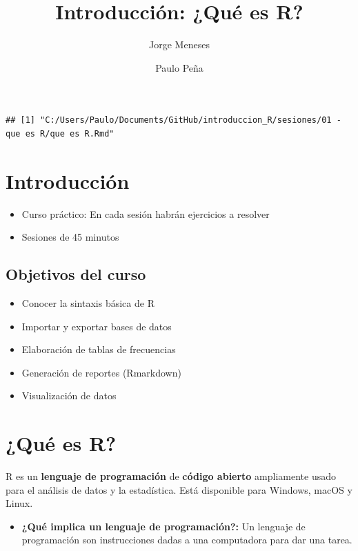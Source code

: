 \documentclass[]{tufte-handout}
\title{Introducción: ¿Qué es R?}
\author{Jorge Meneses \and Paulo Peña}
\date{}
\providecommand{\tightlist}{%
  \setlength{\itemsep}{0pt}\setlength{\parskip}{0pt}}
\begin{document}
\maketitle




\begin{verbatim}
## [1] "C:/Users/Paulo/Documents/GitHub/introduccion_R/sesiones/01 - que es R/que es R.Rmd"
\end{verbatim}

\hypertarget{introducciuxf3n}{%
\section{Introducción}\label{introducciuxf3n}}

\begin{itemize}
\tightlist
\item
  Curso práctico: En cada sesión habrán ejercicios a resolver
\item
  Sesiones de 45 minutos
\end{itemize}

\hypertarget{objetivos-del-curso}{%
\subsection{Objetivos del curso}\label{objetivos-del-curso}}

\begin{itemize}
\tightlist
\item
  Conocer la sintaxis básica de R
\item
  Importar y exportar bases de datos
\item
  Elaboración de tablas de frecuencias
\item
  Generación de reportes (Rmarkdown)
\item
  Visualización de datos
\end{itemize}

\hypertarget{quuxe9-es-r}{%
\section{¿Qué es R?}\label{quuxe9-es-r}}

R es un \textbf{lenguaje de programación} de \textbf{código abierto}
ampliamente usado para el análisis de datos y la estadística. Está
disponible para Windows, macOS y Linux.

\begin{itemize}
\tightlist
\item
  \textbf{¿Qué implica un lenguaje de programación?:} Un lenguaje de
  programación son instrucciones dadas a una computadora para dar una
  tarea.
\end{itemize}
\end{document}
